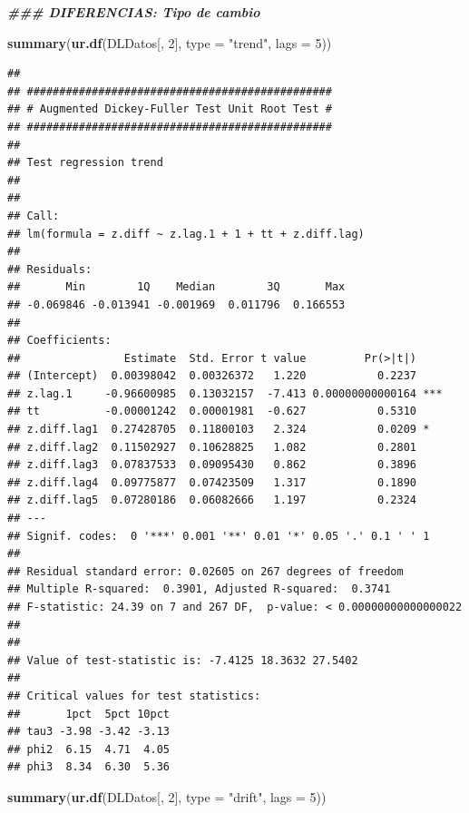 \documentclass[
]{book}
\newenvironment{Shaded}{\begin{snugshade}}{\end{snugshade}}
\newcommand{\AttributeTok}[1]{\textcolor[rgb]{0.13,0.29,0.53}{#1}}
\newcommand{\DecValTok}[1]{\textcolor[rgb]{0.00,0.00,0.81}{#1}}
\newcommand{\DocumentationTok}[1]{\textcolor[rgb]{0.56,0.35,0.01}{\textbf{\textit{#1}}}}
\newcommand{\FunctionTok}[1]{\textcolor[rgb]{0.13,0.29,0.53}{\textbf{#1}}}
\newcommand{\NormalTok}[1]{#1}
\newcommand{\StringTok}[1]{\textcolor[rgb]{0.31,0.60,0.02}{#1}}
\begin{document}
\begin{Shaded}
\begin{Highlighting}[]
\DocumentationTok{\#\#\# DIFERENCIAS: Tipo de cambio}

\FunctionTok{summary}\NormalTok{(}\FunctionTok{ur.df}\NormalTok{(DLDatos[, }\DecValTok{2}\NormalTok{], }\AttributeTok{type =} \StringTok{"trend"}\NormalTok{, }\AttributeTok{lags =} \DecValTok{5}\NormalTok{))}
\end{Highlighting}
\end{Shaded}

\begin{verbatim}
## 
## ############################################### 
## # Augmented Dickey-Fuller Test Unit Root Test # 
## ############################################### 
## 
## Test regression trend 
## 
## 
## Call:
## lm(formula = z.diff ~ z.lag.1 + 1 + tt + z.diff.lag)
## 
## Residuals:
##       Min        1Q    Median        3Q       Max 
## -0.069846 -0.013941 -0.001969  0.011796  0.166553 
## 
## Coefficients:
##                Estimate  Std. Error t value         Pr(>|t|)    
## (Intercept)  0.00398042  0.00326372   1.220           0.2237    
## z.lag.1     -0.96600985  0.13032157  -7.413 0.00000000000164 ***
## tt          -0.00001242  0.00001981  -0.627           0.5310    
## z.diff.lag1  0.27428705  0.11800103   2.324           0.0209 *  
## z.diff.lag2  0.11502927  0.10628825   1.082           0.2801    
## z.diff.lag3  0.07837533  0.09095430   0.862           0.3896    
## z.diff.lag4  0.09775877  0.07423509   1.317           0.1890    
## z.diff.lag5  0.07280186  0.06082666   1.197           0.2324    
## ---
## Signif. codes:  0 '***' 0.001 '**' 0.01 '*' 0.05 '.' 0.1 ' ' 1
## 
## Residual standard error: 0.02605 on 267 degrees of freedom
## Multiple R-squared:  0.3901, Adjusted R-squared:  0.3741 
## F-statistic: 24.39 on 7 and 267 DF,  p-value: < 0.00000000000000022
## 
## 
## Value of test-statistic is: -7.4125 18.3632 27.5402 
## 
## Critical values for test statistics: 
##       1pct  5pct 10pct
## tau3 -3.98 -3.42 -3.13
## phi2  6.15  4.71  4.05
## phi3  8.34  6.30  5.36
\end{verbatim}

\begin{Shaded}
\begin{Highlighting}[]
\FunctionTok{summary}\NormalTok{(}\FunctionTok{ur.df}\NormalTok{(DLDatos[, }\DecValTok{2}\NormalTok{], }\AttributeTok{type =} \StringTok{"drift"}\NormalTok{, }\AttributeTok{lags =} \DecValTok{5}\NormalTok{))}
\end{Highlighting}
\end{Shaded}
\end{document}
